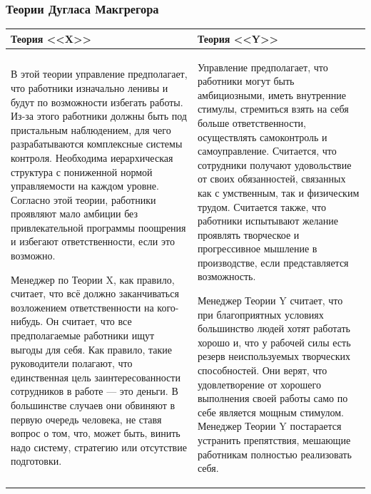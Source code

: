 \documentclass[a4paper,12pt,oneside,final]{extarticle}
\numberwithin{equation}{section}
\begin{document}
\subsubsection{Теории Дугласа Макгрегора}
\begin{tabularx}{\textwidth}{X|X}
	\textbf{Теория <<X>>} & \textbf{Теория <<Y>>} \\ \hline
	В этой теории управление предполагает, что работники изначально ленивы и будут по возможности избегать работы. 
	Из-за этого работники должны быть под пристальным наблюдением, для чего разрабатываются комплексные системы контроля. 
	Необходима иерархическая структура с пониженной нормой управляемости на каждом уровне. 
	Согласно этой теории, работники проявляют мало амбиции без привлекательной программы поощрения и избегают ответственности, если это возможно.

	Менеджер по Теории X, как правило, считает, что всё должно заканчиваться возложением ответственности на кого-нибудь. 
	Он считает, что все предполагаемые работники ищут выгоды для себя. 
	Как правило, такие руководители полагают, что единственная цель заинтересованности сотрудников в работе --- это деньги. 
	В большинстве случаев они обвиняют в первую очередь человека, не ставя вопрос о том, что, может быть, винить надо систему, стратегию или отсутствие подготовки.
	&
	Управление предполагает, что работники могут быть амбициозными, иметь внутренние стимулы, стремиться взять на себя больше ответственности, осуществлять самоконтроль и самоуправление. 
	Считается, что сотрудники получают удовольствие от своих обязанностей, связанных как с умственным, так и физическим трудом. 
	Считается также, что работники испытывают желание проявлять творческое и прогрессивное мышление в производстве, если представляется возможность.

	Менеджер Теории Y считает, что при благоприятных условиях большинство людей хотят работать хорошо и, что у рабочей силы есть резерв неиспользуемых творческих способностей. 
	Они верят, что удовлетворение от хорошего выполнения своей работы само по себе является мощным стимулом. 
	Менеджер Теории Y постарается устранить препятствия, мешающие работникам полностью реализовать себя.
\end{tabularx}
\end{document}
